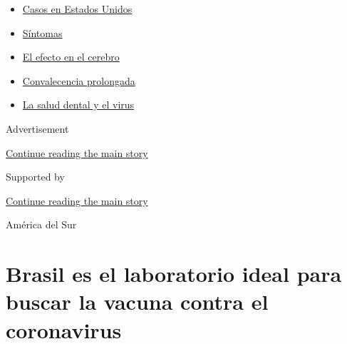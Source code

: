 \begin{itemize}
\tightlist
\item
  \href{https://www.nytimes3xbfgragh.onion/es/interactive/2020/espanol/mundo/coronavirus-en-estados-unidos.html?name=styln-coronavirus-es\&region=TOP_BANNER\&block=storyline_menu_recirc\&action=click\&pgtype=Article\&impression_id=e3193ab1-f4b9-11ea-b32a-256dc0696bd9\&variant=undefined}{Casos
  en Estados Unidos}
\item
  \href{https://www.nytimes3xbfgragh.onion/es/interactive/2020/08/06/espanol/ciencia-y-tecnologia/tengo-covid-19-sintomas.html?name=styln-coronavirus-es\&region=TOP_BANNER\&block=storyline_menu_recirc\&action=click\&pgtype=Article\&impression_id=e3193ab2-f4b9-11ea-b32a-256dc0696bd9\&variant=undefined}{Síntomas}
\item
  \href{https://www.nytimes3xbfgragh.onion/es/2020/09/11/espanol/ciencia-y-tecnologia/cerebro-coronavirus.html?name=styln-coronavirus-es\&region=TOP_BANNER\&block=storyline_menu_recirc\&action=click\&pgtype=Article\&impression_id=e3193ab3-f4b9-11ea-b32a-256dc0696bd9\&variant=undefined}{El
  efecto en el cerebro}
\item
  \href{https://www.nytimes3xbfgragh.onion/es/2020/09/09/espanol/ciencia-y-tecnologia/salud-mental-coronavirus.html?name=styln-coronavirus-es\&region=TOP_BANNER\&block=storyline_menu_recirc\&action=click\&pgtype=Article\&impression_id=e31961c0-f4b9-11ea-b32a-256dc0696bd9\&variant=undefined}{Convalecencia
  prolongada}
\item
  \href{https://www.nytimes3xbfgragh.onion/es/2020/09/08/espanol/ciencia-y-tecnologia/dentistas-covid-dientes.html?name=styln-coronavirus-es\&region=TOP_BANNER\&block=storyline_menu_recirc\&action=click\&pgtype=Article\&impression_id=e31961c1-f4b9-11ea-b32a-256dc0696bd9\&variant=undefined}{La
  salud dental y el virus}
\end{itemize}

Advertisement

\protect\hyperlink{after-top}{Continue reading the main story}

Supported by

\protect\hyperlink{after-sponsor}{Continue reading the main story}

América del Sur

\hypertarget{brasil-es-el-laboratorio-ideal-para-buscar-la-vacuna-contra-el-coronavirus}{%
\section{Brasil es el laboratorio ideal para buscar la vacuna contra el
coronavirus}\label{brasil-es-el-laboratorio-ideal-para-buscar-la-vacuna-contra-el-coronavirus}}

